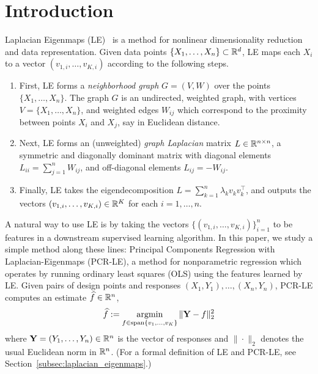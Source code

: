 \section{Introduction}
\label{sec:introduction}

Laplacian Eigenmaps (LE)~\citep{belkin03a} is a method for nonlinear dimensionality reduction and data representation. Given data points $\{X_1,\ldots,X_n\} \subset \mathbb{R}^d$, LE maps each $X_i$ to a vector $(v_{1,i},\ldots,v_{K,i})$ according to the following steps.
\begin{enumerate}
	\item First, LE forms a \emph{neighborhood graph} $G = (V,W)$ over the points $\{X_1,\ldots,X_n\}$. The graph $G$ is an undirected, weighted graph, with vertices $V = \{X_1,\ldots,X_n\}$, and weighted edges $W_{ij}$ which correspond to the proximity between points $X_i$ and $X_j$, say in Euclidean distance.
	\item Next, LE forms an (unweighted) \emph{graph Laplacian} matrix $L \in \mathbb{R}^{n \times n}$, a symmetric and diagonally dominant matrix with diagonal elements $L_{ii} = \sum_{j = 1}^{n} W_{ij}$, and off-diagonal elements $L_{ij} = -W_{ij}$. 
	\item Finally, LE takes the eigendecomposition $L = \sum_{k = 1}^{n} \lambda_k v_k v_k^{\top}$, and outputs the vectors $(v_{1,i},\ldots,v_{K,i}) \in \mathbb{R}^K$ for each $i = 1,\ldots,n$.
\end{enumerate} 
A natural way to use LE is by taking the vectors $\{(v_{1,i},\ldots,v_{K,i})\}_{i = 1}^{n}$ to be features in a downstream supervised learning algorithm. In this paper, we study a simple method along these lines: Principal Components Regression with Laplacian-Eigenmaps (PCR-LE), a method for nonparametric regression which operates by running ordinary least squares (OLS) using the features learned by LE. Given pairs of design points and responses $(X_1,Y_1),\ldots, (X_n,Y_n)$, PCR-LE computes an estimate $\widehat{f} \in \mathbb{R}^n$,
\begin{equation}
\label{eqn:pcr-le}
\widehat{f} := \mathop{\mathrm{argmin}}_{f \in \mathrm{span}\{v_1,\ldots,v_K\}} \|{\bf Y} - f\|_2^2
\end{equation}
where ${\bf Y} = (Y_1,\ldots,Y_n) \in \mathbb{R}^n$ is the vector of responses and $\|\cdot\|_2$ denotes the usual Euclidean norm in $\mathbb{R}^n$. (For a formal definition of LE and PCR-LE, see Section~\ref{subsec:laplacian_eigenmaps}.)

